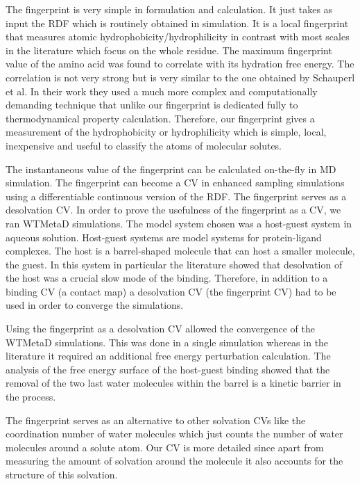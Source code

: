The fingerprint is very 
simple in formulation and calculation. It just takes as input the RDF which is routinely 
obtained in simulation. It is a local fingerprint 
that measures atomic hydrophobicity/hydrophilicity in contrast with most scales in the 
literature which focus on the whole residue\cite{Simm2016}. The maximum fingerprint value of 
the amino acid was found to correlate with its hydration free energy. The correlation is not 
very strong but is very similar to the one obtained by Schauperl et al\cite{Schauperl2016}. In 
their 
work they used a much more complex and computationally demanding technique that unlike our 
fingerprint is dedicated fully to thermodynamical property calculation. Therefore, our 
fingerprint gives a measurement of the hydrophobicity or hydrophilicity which is simple, 
local, inexpensive and useful to classify the atoms of molecular solutes. 

The instantaneous value of the fingerprint can be calculated on-the-fly in MD
simulation. The fingerprint can become a CV in enhanced sampling simulations using a 
differentiable continuous version of the RDF. The fingerprint serves as a 
desolvation CV. In order to prove the usefulness of the fingerprint as a 
CV, we ran WTMetaD simulations. The model system chosen was a host-guest system in 
aqueous solution. Host-guest systems are model systems for protein-ligand complexes. The 
host is a barrel-shaped molecule that can host a smaller molecule, the guest. In this system 
in 
particular the literature showed that desolvation of the host was a crucial slow mode of 
the binding\cite{Bhakat2017a}. Therefore, in addition to a binding CV (a contact map) a 
desolvation CV (the fingerprint CV) had to be used in order to converge the simulations.

Using the 
fingerprint as a desolvation CV allowed the convergence of the WTMetaD simulations. 
This was done in a single simulation whereas in the literature it required an 
additional free energy perturbation calculation\cite{Bhakat2017a}. The analysis of the free 
energy surface of the host-guest binding showed that the removal of the two last water 
molecules within the barrel is a kinetic barrier in the process. 

The fingerprint serves as 
an alternative to other solvation CVs like the coordination number of water molecules which just 
counts the number of water molecules around a solute atom. Our CV is more detailed since apart from 
measuring the amount of solvation around the molecule it also accounts for the structure 
of this solvation.

